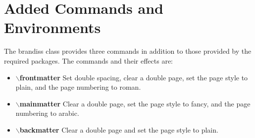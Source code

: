 \documentclass[12pt]{article}
\begin{document}
\section{Added Commands and Environments}

The brandiss class provides three commands in addition to those
provided by the required packages.  The commands and their effects
are:
\begin{itemize}
\item\textbf{$\backslash$frontmatter} Set double spacing, clear a double
  page, set the page style to plain, and the page numbering to roman.
\item\textbf{$\backslash$mainmatter} Clear a double page, set the page style
  to fancy, and the page numbering to arabic.
\item\textbf{$\backslash$backmatter} Clear a double page and set the page
  style to plain.
\end{itemize}
\end{document}
